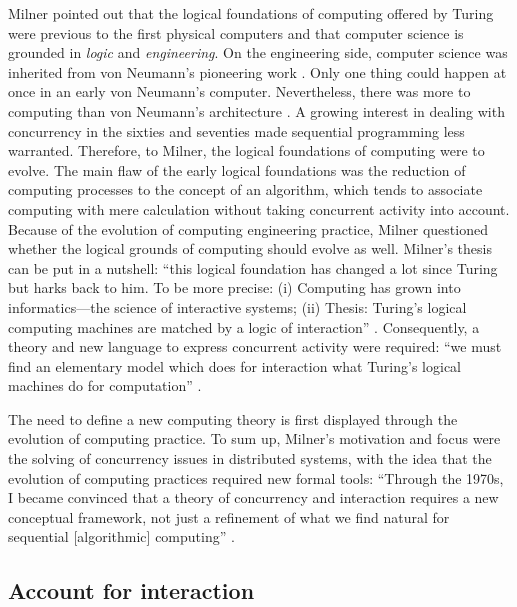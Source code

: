 \documentclass[a4paper, 11pt, twoside]{article}
\begin{document}
Milner \parencite*{Milner2006} pointed out  that the logical foundations of computing offered by Turing \parencite*{Turing1937} were previous to the first physical computers and that computer science is grounded in \emph{logic} and \emph{engineering}. On the engineering side, computer science was inherited from von Neumann’s pioneering work \parencite{Godfrey1993, Aspray1990}. Only one thing could happen at once in an early von Neumann's computer. Nevertheless, there was more to computing than von Neumann's architecture \parencite{Backus1978, Milner2006}. A growing interest in dealing with concurrency in the sixties and seventies made sequential programming less warranted. Therefore, to Milner, the logical foundations of computing were to evolve. The main flaw of the early logical foundations was the reduction of computing processes to the concept of an algorithm, which tends to associate computing with mere calculation without taking concurrent activity into account. Because of the evolution of computing engineering practice, Milner questioned whether the logical grounds of computing should evolve as well. Milner's thesis can be put in a nutshell: ``this logical foundation has changed a lot since Turing but harks back to him. To be more precise: (i) Computing has grown into informatics---the science of interactive systems; (ii) Thesis: Turing's logical computing machines are matched by a logic of interaction'' \parencite{Milner2006}. Consequently, a theory and new language to express concurrent activity were required: ``we must find an elementary model which does for interaction what Turing's logical machines do for computation'' \parencite{Milner2006}. 

The need to define a new computing theory is first displayed through the evolution of computing practice.
To sum up, Milner’s motivation and focus were the solving of concurrency issues in distributed systems, with the idea that the evolution of computing practices required new formal tools: ``Through the 1970s, I became convinced that a theory of concurrency and interaction requires a new conceptual framework, not just a refinement of what we find natural for sequential [algorithmic] computing'' \parencite{Milner1993}. 

\subsection{Account for interaction}
\end{document}
